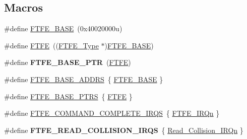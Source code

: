 \subsection*{Macros}
\begin{DoxyCompactItemize}
\item 
\#define \hyperlink{group__FTFE__Peripheral__Access__Layer_ga78ffb1457d354ca3ed49ee1b93b78193}{F\+T\+F\+E\+\_\+\+B\+A\+SE}~(0x40020000u)
\item 
\#define \hyperlink{group__FTFE__Peripheral__Access__Layer_ga08e0af7718eb3edb5211071bc350605c}{F\+T\+FE}~((\hyperlink{structFTFE__Type}{F\+T\+F\+E\+\_\+\+Type} $\ast$)\hyperlink{group__FTFE__Peripheral__Access__Layer_ga78ffb1457d354ca3ed49ee1b93b78193}{F\+T\+F\+E\+\_\+\+B\+A\+SE})
\item 
\#define {\bfseries F\+T\+F\+E\+\_\+\+B\+A\+S\+E\+\_\+\+P\+TR}~(\hyperlink{group__FTFE__Peripheral__Access__Layer_ga08e0af7718eb3edb5211071bc350605c}{F\+T\+FE})\hypertarget{group__FTFE__Peripheral__Access__Layer_ga459f4097b9fd3f09e7bf790c17831f83}{}\label{group__FTFE__Peripheral__Access__Layer_ga459f4097b9fd3f09e7bf790c17831f83}

\item 
\#define \hyperlink{group__FTFE__Peripheral__Access__Layer_gae4cbd5858122e7e88e3e6227507954ad}{F\+T\+F\+E\+\_\+\+B\+A\+S\+E\+\_\+\+A\+D\+D\+RS}~\{ \hyperlink{group__FTFE__Peripheral__Access__Layer_ga78ffb1457d354ca3ed49ee1b93b78193}{F\+T\+F\+E\+\_\+\+B\+A\+SE} \}
\item 
\#define \hyperlink{group__FTFE__Peripheral__Access__Layer_ga5ae2dee20c785365da3d603faf7a1dd2}{F\+T\+F\+E\+\_\+\+B\+A\+S\+E\+\_\+\+P\+T\+RS}~\{ \hyperlink{group__FTFE__Peripheral__Access__Layer_ga08e0af7718eb3edb5211071bc350605c}{F\+T\+FE} \}
\item 
\#define \hyperlink{group__FTFE__Peripheral__Access__Layer_gaaac748d7395492209690894787db8ce0}{F\+T\+F\+E\+\_\+\+C\+O\+M\+M\+A\+N\+D\+\_\+\+C\+O\+M\+P\+L\+E\+T\+E\+\_\+\+I\+R\+QS}~\{ \hyperlink{group__Interrupt__vector__numbers_gga666eb0caeb12ec0e281415592ae89083abaa48ed6ed98d36e090f1d18dff97da2}{F\+T\+F\+E\+\_\+\+I\+R\+Qn} \}
\item 
\#define {\bfseries F\+T\+F\+E\+\_\+\+R\+E\+A\+D\+\_\+\+C\+O\+L\+L\+I\+S\+I\+O\+N\+\_\+\+I\+R\+QS}~\{ \hyperlink{group__Interrupt__vector__numbers_gga666eb0caeb12ec0e281415592ae89083aa3caf4837979a4a300de12aa1ec8fc74}{Read\+\_\+\+Collision\+\_\+\+I\+R\+Qn} \}\hypertarget{group__FTFE__Peripheral__Access__Layer_gaf8570868b30e7a06fe146f27610363d9}{}\label{group__FTFE__Peripheral__Access__Layer_gaf8570868b30e7a06fe146f27610363d9}


\end{DoxyCompactItemize}
